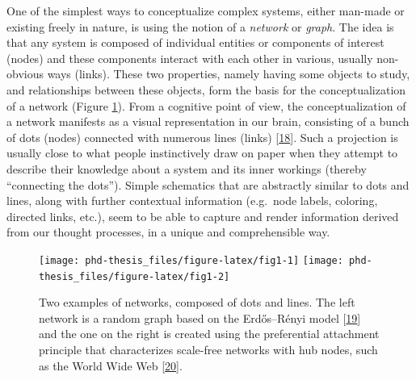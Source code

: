 \documentclass[
  12pt,
]{book}
\begin{document}
One of the simplest ways to conceptualize complex systems, either man-made or existing freely in nature, is using the notion of a \emph{network} or \emph{graph}.
The idea is that any system is composed of individual entities or components of interest (nodes) and these components interact with each other in various, usually non-obvious ways (links).
These two properties, namely having some objects to study, and relationships between these objects, form the basis for the conceptualization of a network (Figure \ref{fig:fig1}).
From a cognitive point of view, the conceptualization of a network manifests as a visual representation in our brain, consisting of a bunch of dots (nodes) connected with numerous lines (links) {[}\protect\hyperlink{ref-Trudeau1976}{18}{]}.
Such a projection is usually close to what people instinctively draw on paper when they attempt to describe their knowledge about a system and its inner workings (thereby ``connecting the dots'').
Simple schematics that are abstractly similar to dots and lines, along with further contextual information (e.g.~node labels, coloring, directed links, etc.), seem to be able to capture and render information derived from our thought processes, in a unique and comprehensible way.



\begin{figure}
\texttt{[image: phd-thesis\_files/figure-latex/fig1-1]} \texttt{[image: phd-thesis\_files/figure-latex/fig1-2]} \caption{Two examples of networks, composed of dots and lines. The left network is a random graph based on the Erdős--Rényi model {[}\protect\hyperlink{ref-Erdos1960}{19}{]} and the one on the right is created using the preferential attachment principle that characterizes scale-free networks with hub nodes, such as the World Wide Web {[}\protect\hyperlink{ref-Barabasi1999}{20}{]}.}\label{fig:fig1}
\end{figure}
\end{document}
